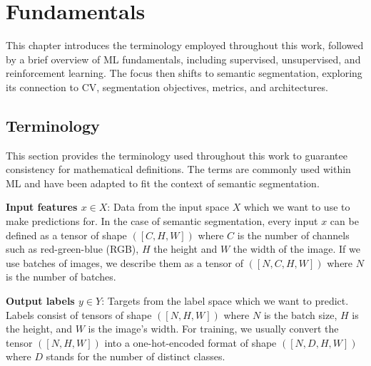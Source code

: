 \chapter{Fundamentals}
\label{chap:fundamentals}
This chapter introduces the terminology employed throughout this work, followed by a brief overview of \acf{ML} fundamentals, including supervised, unsupervised, and reinforcement learning. The focus then shifts to semantic segmentation, exploring its connection to \acf{CV}, segmentation objectives, metrics, and architectures.
\section{Terminology}
\label{sec:terminology}
This section provides the terminology used throughout this work to guarantee consistency for mathematical definitions. The terms are commonly used within \ac{ML} and have been adapted to fit the context of semantic segmentation.

\textbf{Input features $x\in X$}: Data from the input space $X$ which we want to use to make predictions for. In the case of semantic segmentation, every input $x$ can be defined as a tensor of shape $([C,H,W])$ where $C$ is the number of channels such as red-green-blue (RGB), $H$ the height and $W$ the width of the image. If we use batches of images, we describe them as a tensor of $([N,C,H,W])$ where $N$ is the number of batches.

\textbf{Output labels $y\in Y$}: Targets from the label space which we want to predict. Labels consist of tensors of shape $([N,H,W])$ where $N$ is the batch size, $H$ is the height, and $W$ is the image's width. For training, we usually convert the tensor $([N,H,W])$ into a one-hot-encoded format of shape $([N,D,H,W])$ where $D$ stands for the number of distinct classes.

